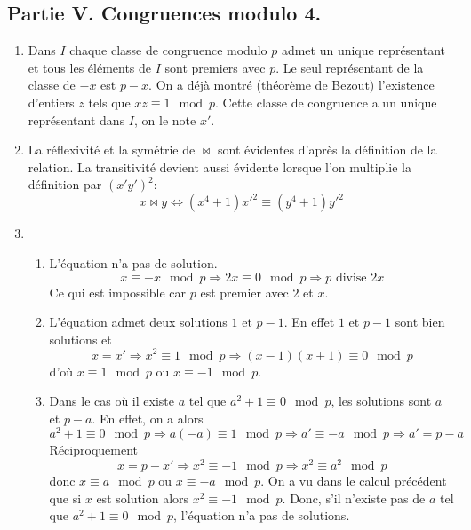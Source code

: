 \subsection*{Partie V. Congruences modulo 4.}
\begin{enumerate}
\item Dans $I$ chaque classe de congruence modulo $p$ admet un unique représentant et tous les éléments de $I$ sont premiers avec $p$.\newline
Le seul représentant de la classe de $-x$ est $p-x$. On a déjà montré (théorème de Bezout) l'existence d'entiers $z$ tels que $xz\equiv 1 \mod p$. Cette classe de congruence a un unique représentant dans $I$, on le note $x'$.
\item La réflexivité et la symétrie de $\bowtie$ sont évidentes d'après la définition de la relation. La transitivité devient aussi évidente lorsque l'on multiplie la définition par $(x'y')^2$:
\begin{displaymath}
  x \bowtie y \Leftrightarrow (x^4+1)x'^2 \equiv (y^4+1)y'^2
\end{displaymath}

\item
\begin{enumerate}
  \item L'équation n'a pas de solution.
\begin{displaymath}
  x \equiv -x \mod p \Rightarrow 2x \equiv 0 \mod p \Rightarrow p \text{ divise } 2x
\end{displaymath}
Ce qui est impossible car $p$ est premier avec $2$ et $x$.
  \item L'équation admet deux solutions $1$ et $p-1$. En effet $1$ et $p-1$ sont bien solutions et
\begin{displaymath}
  x = x' \Rightarrow x^2 \equiv 1 \mod p \Rightarrow (x-1)(x+1)\equiv 0 \mod p
\end{displaymath}
d'où $x \equiv 1 \mod p$  ou $x \equiv -1 \mod p$.
  \item Dans le cas où il existe $a$ tel que $a^2+1\equiv 0 \mod p$, les solutions sont $a$ et $p-a$.\newline
En effet, on a alors
\begin{displaymath}
a^2+1\equiv 0 \mod p \Rightarrow a(-a)\equiv 1 \mod p \Rightarrow a' \equiv -a \mod p \Rightarrow a' = p- a   
\end{displaymath}
Réciproquement
\begin{displaymath}
  x =p-x' \Rightarrow x^2 \equiv -1 \mod p \Rightarrow x^2 \equiv a^2 \mod p
\end{displaymath}
donc $x\equiv a\mod p$ ou $x\equiv -a \mod p$.\newline
On a vu dans le calcul précédent que si $x$ est solution alors $x^2 \equiv -1 \mod p$. Donc, s'il n'existe pas de $a$ tel que $a^2+1 \equiv 0 \mod p$, l'équation n'a pas de solutions.
\end{enumerate}


\end{enumerate}
